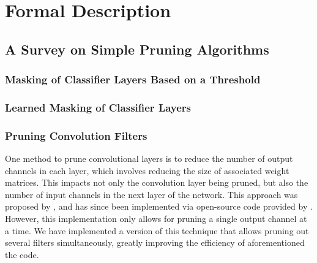 \documentclass{article}
\begin{document}
\section{Formal Description}

\subsection{A Survey on Simple Pruning Algorithms}

\subsubsection{Masking of Classifier Layers Based on a Threshold} \label{MaskClass}

\subsubsection{Learned Masking of Classifier Layers} \label{MaskClassL0}

\subsubsection{Pruning Convolution Filters} \label{PruneFilter}

One method to prune convolutional layers is to reduce the number of output channels in each layer, which involves reducing the size of associated weight matrices. This impacts not only the convolution layer being pruned, but also the number of input channels in the next layer of the network. This approach was proposed by \cite{prune_transfer_learning}, and has since been implemented via open-source code provided by \cite{jacobgilblog}. However, this implementation only allows for pruning a single output channel at a time. We have implemented a version of this technique that allows pruning out several filters simultaneously, greatly improving the efficiency of aforementioned the code.
\end{document}
